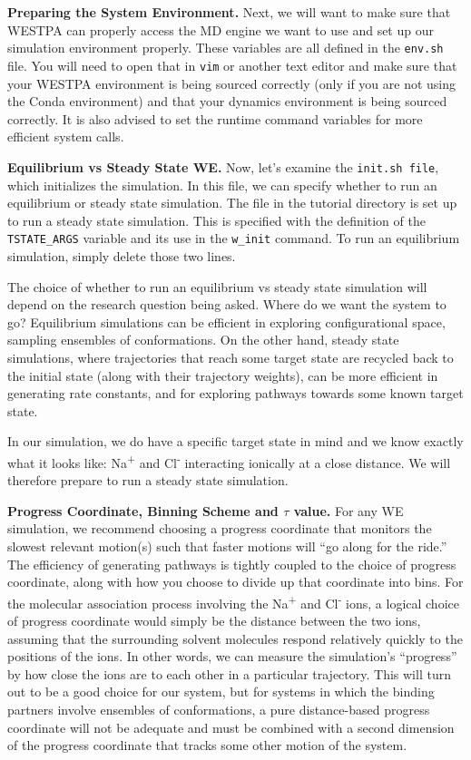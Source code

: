 \documentclass[9pt,tutorial]{livecoms}
\begin{document}
\textbf{Preparing the System Environment.} Next, we will want to make sure that WESTPA can properly access the MD engine we want to use and set up our simulation environment properly. 
These variables are all defined in the \verb|env.sh| file. 
You will need to open that in \verb|vim| or another text editor and make sure that your WESTPA environment is being sourced correctly (only if you are not using the Conda environment) and that your dynamics environment is being sourced correctly. 
It is also advised to set the runtime command variables for more efficient system calls.

\textbf{Equilibrium vs Steady State WE.} Now, let’s examine the \verb|init.sh file|, which initializes the simulation. 
In this file, we can specify whether to run an equilibrium or steady state simulation. 
The file in the tutorial directory is set up to run a steady state simulation. 
This is specified with the definition of the \verb|TSTATE_ARGS| variable and its use in the \verb|w_init| command. 
To run an equilibrium simulation, simply delete those two lines.

The choice of whether to run an equilibrium vs steady state simulation will depend on the research question being asked. 
Where do we want the system to go?  
Equilibrium simulations can be efficient in exploring configurational space, sampling ensembles of conformations. 
On the other hand, steady state simulations, where trajectories that reach some target state are recycled back to the initial state (along with their trajectory weights), can be more efficient in generating rate constants, and for exploring pathways towards some known target state. 

In our simulation, we do have a specific target state in mind and we know exactly what it looks like: Na\textsuperscript{+} and Cl\textsuperscript{-} interacting ionically at a close distance. 
We will therefore prepare to run a steady state simulation. 

\textbf{Progress Coordinate, Binning Scheme and $\tau$ value.}  For any WE simulation, we recommend choosing a progress coordinate that monitors the slowest relevant motion(s) such that faster motions will “go along for the ride.” 
The efficiency of generating pathways is tightly coupled to the choice of progress coordinate, along with how you choose to divide up that coordinate into bins. 
For the molecular association process involving the Na\textsuperscript{+} and Cl\textsuperscript{-} ions, a logical choice of progress coordinate would simply be the distance between the two ions, assuming that the surrounding solvent molecules respond relatively quickly to the positions of the ions. 
In other words, we can measure the simulation’s “progress” by how close the ions are to each other in a particular trajectory. 
This will turn out to be a good choice for our system, but for systems in which the binding partners involve ensembles of conformations, a pure distance-based progress coordinate will not be adequate and must be combined with a second dimension of the progress coordinate that tracks some other motion of the system.
\end{document}
